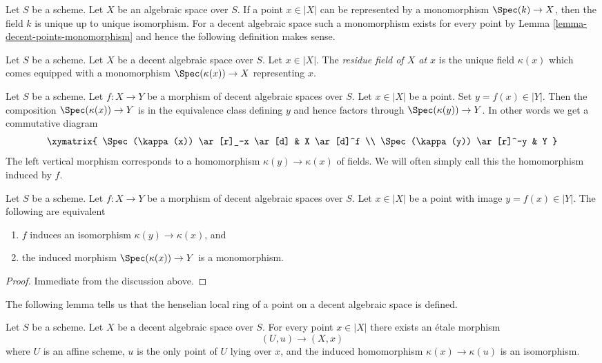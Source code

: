 \noindent
Let $S$ be a scheme. Let $X$ be an algebraic space over $S$.
If a point $x \in |X|$ can be represented by a monomorphism
$\Spec(k) \to X$, then the field $k$ is unique up to unique
isomorphism. For a decent
algebraic space such a monomorphism exists for every point
by Lemma \ref{lemma-decent-points-monomorphism}
and hence the following definition makes sense.

\begin{definition}
\label{definition-residue-field}
Let $S$ be a scheme. Let $X$ be a decent algebraic space over $S$.
Let $x \in |X|$. The {\it residue field of $X$ at $x$}
is the unique field $\kappa(x)$ which comes equipped with a
monomorphism $\Spec(\kappa(x)) \to X$ representing $x$.
\end{definition}

\noindent
Let $S$ be a scheme. Let $f : X \to Y$ be a morphism of decent
algebraic spaces over $S$. Let $x \in |X|$ be a point.
Set $y = f(x) \in |Y|$. Then the composition $\Spec(\kappa(x)) \to Y$
is in the equivalence class defining $y$ and hence factors through
$\Spec(\kappa(y)) \to Y$. In other words we get a commutative diagram
$$
\xymatrix{
\Spec(\kappa(x)) \ar[r]_-x \ar[d] & X \ar[d]^f \\
\Spec(\kappa(y)) \ar[r]^-y & Y
}
$$
The left vertical morphism corresponds to a homomorphism
$\kappa(y) \to \kappa(x)$ of fields. We will often simply
call this the homomorphism induced by $f$.

\begin{lemma}
\label{lemma-identifies-residue-fields}
Let $S$ be a scheme. Let $f : X \to Y$ be a morphism of decent
algebraic spaces over $S$. Let $x \in |X|$ be a point
with image $y = f(x) \in |Y|$.
The following are equivalent
\begin{enumerate}
\item $f$ induces an isomorphism $\kappa(y) \to \kappa(x)$, and
\item the induced morphism $\Spec(\kappa(x)) \to Y$ is a monomorphism.
\end{enumerate}
\end{lemma}

\begin{proof}
Immediate from the discussion above.
\end{proof}

\noindent
The following lemma tells us that the henselian local ring of a point
on a decent algebraic space is defined.

\begin{lemma}
\label{lemma-decent-space-elementary-etale-neighbourhood}
Let $S$ be a scheme. Let $X$ be a decent algebraic space over $S$.
For every point $x \in |X|$ there exists an \'etale morphism
$$
(U, u) \longrightarrow (X, x)
$$
where $U$ is an affine scheme, $u$ is the only point of $U$ lying
over $x$, and the induced homomorphism $\kappa(x) \to \kappa(u)$
is an isomorphism.
\end{lemma}

